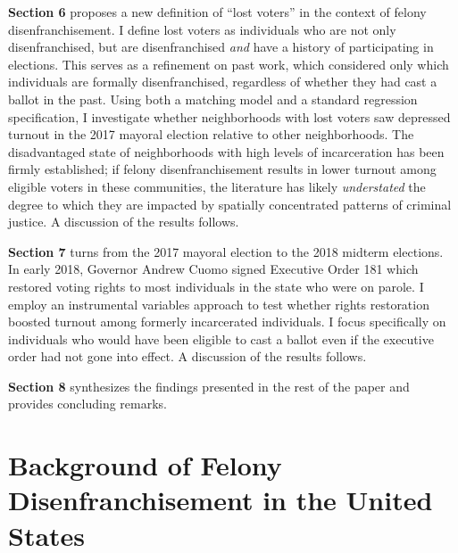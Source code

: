 \documentclass[12pt,]{article}
\begin{document}
\textbf{Section 6} proposes a new definition of ``lost voters'' in the context of felony disenfranchisement. I define lost voters as individuals who are not only disenfranchised, but are disenfranchised \emph{and} have a history of participating in elections. This serves as a refinement on past work, which considered only which individuals are formally disenfranchised, regardless of whether they had cast a ballot in the past. Using both a matching model and a standard regression specification, I investigate whether neighborhoods with lost voters saw depressed turnout in the 2017 mayoral election relative to other neighborhoods. The disadvantaged state of neighborhoods with high levels of incarceration has been firmly established; if felony disenfranchisement results in lower turnout among eligible voters in these communities, the literature has likely \emph{understated} the degree to which they are impacted by spatially concentrated patterns of criminal justice. A discussion of the results follows.

\textbf{Section 7} turns from the 2017 mayoral election to the 2018 midterm elections. In early 2018, Governor Andrew Cuomo signed Executive Order 181 which restored voting rights to most individuals in the state who were on parole. I employ an instrumental variables approach to test whether rights restoration boosted turnout among formerly incarcerated individuals. I focus specifically on individuals who would have been eligible to cast a ballot even if the executive order had not gone into effect. A discussion of the results follows.

\textbf{Section 8} synthesizes the findings presented in the rest of the paper and provides concluding remarks.

\hypertarget{background-of-felony-disenfranchisement-in-the-united-states}{%
\section{Background of Felony Disenfranchisement in the United States}\label{background-of-felony-disenfranchisement-in-the-united-states}}
\end{document}
